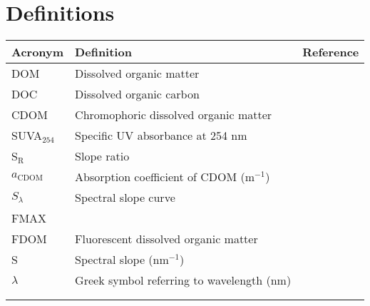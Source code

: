 \documentclass[]{book}
\begin{document}
\chapter{Definitions}\label{definitions}

\begin{longtable}[]{@{}lll@{}}
\toprule
Acronym & Definition & Reference\tabularnewline
\midrule
\endhead
DOM & Dissolved organic matter &\tabularnewline
DOC & Dissolved organic carbon &\tabularnewline
CDOM & Chromophoric dissolved organic matter &\tabularnewline
SUVA\(_{254}\) & Specific UV absorbance at 254 nm &
\citet{Weishaar2003}\tabularnewline
S\(_\text{R}\) & Slope ratio & \citet{Helms2008}\tabularnewline
\(a_\text{CDOM}\) & Absorption coefficient of CDOM (m\(^{-1}\))
&\tabularnewline
\(S_\lambda\) & Spectral slope curve &
\citet{Loiselle2009}\tabularnewline
FMAX & &\tabularnewline
FDOM & Fluorescent dissolved organic matter &\tabularnewline
S & Spectral slope (nm\(^{-1}\)) &\tabularnewline
\(\lambda\) & Greek symbol referring to wavelength (nm) &\tabularnewline
& &\tabularnewline
& &\tabularnewline
\bottomrule
\end{longtable}


\end{document}
